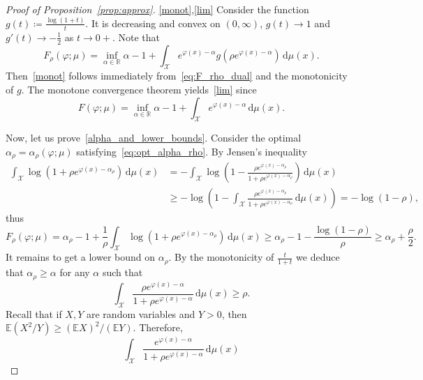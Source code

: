 \documentclass{article}
\newcommand{\dd}{\,\mathrm{d}}
\newcommand{\R}{\mathbb{R}}
\newcommand{\E}{\mathbb{E}}
\newcommand*{\eqset}{\coloneqq}
\def\cX{\mathcal{X}}
\theoremstyle{plain}
\theoremstyle{definition}
\theoremstyle{remark}
\begin{document}
\begin{proof}[Proof of Proposition~\ref{prop:approx}]
    \ref{monot},\ref{lim} Consider the function $g(t) \eqset \frac{\log(1 + t)}{t}$. 
    It is decreasing and convex on $(0, \infty)$, $g(t) \to 1$ and $g'(t) \to - \frac{1}{2}$ as $t \to 0+$.
    Note that
    \[
    F_\rho(\varphi ; \mu) = \inf_{\alpha \in \R} \alpha - 1 + \int_{\cX} e^{\varphi(x) - \alpha} g\left(\rho e^{\varphi(x) - \alpha}\right) \dd \mu(x) .
    \]
    Then~\ref{monot} follows immediately from~\eqref{eq:F_rho_dual} and the monotonicity of $g$. 
    The monotone convergence theorem yields~\ref{lim} since
    \[
    F(\varphi; \mu) = \inf_{\alpha \in \R} \alpha - 1 + \int_{ {\cX}} e^{\varphi(x) - \alpha} \dd \mu(x) .
    \]

    Now, let us prove~\ref{alpha_and_lower_bounds}. Consider the optimal $\alpha_{\rho} = \alpha_\rho(\varphi;\mu)$ satisfying~\eqref{eq:opt_alpha_rho}. 
    By Jensen's inequality
    \begin{align*}
        \int_{ {\cX}} \log\left(1 + \rho e^{\varphi(x) - \alpha_\rho}\right) \dd \mu(x) 
        &= - \int_{ {\cX}} \log\left(1 - \frac{\rho e^{\varphi(x) - \alpha_\rho}}{1 + \rho e^{\varphi(x) - \alpha_\rho}}\right) \dd \mu(x) \\
        &\ge - \log\left(1 - \int_{ {\cX}} \frac{\rho e^{\varphi(x) - \alpha_\rho}}{1 + \rho e^{\varphi(x) - \alpha_\rho}} \dd \mu(x)\right) = - \log(1 - \rho) ,
    \end{align*}
    thus
    \begin{equation}\label{eq:lower_1}
        F_\rho(\varphi; \mu) = \alpha_\rho - 1 + \frac{1}{\rho} \int_{ {\cX}} \log\left(1 + \rho e^{\varphi(x) - \alpha_\rho}\right) \dd \mu(x) 
        \ge \alpha_\rho - 1 - \frac{\log(1 - \rho)}{\rho} 
        \ge \alpha_\rho + \frac{\rho}{2} .
    \end{equation}
    It remains to get a lower bound on $\alpha_\rho$. 
    By the monotonicity of $\frac{t}{1+t}$ we deduce that $\alpha_\rho \ge \alpha$ for any $\alpha$ such that
    \begin{equation}\label{eq:smaller_alpha}
        \int_{ {\cX}} \frac{\rho e^{\varphi(x) - \alpha}}{1 + \rho e^{\varphi(x) - \alpha}} \dd \mu(x) \ge \rho .
    \end{equation}
    Recall that if $X,Y$ are random variables and $Y>0$, then $\E(X^2/Y) \geq (\E X)^2 / (\E Y)$. Therefore,
    \begin{equation*}
        \int_{ {\cX}} \frac{e^{\varphi(x) - \alpha}}{1 + \rho e^{\varphi(x) - \alpha}} \dd \mu(x) 

\end{equation*}
\end{proof}
\end{document}
